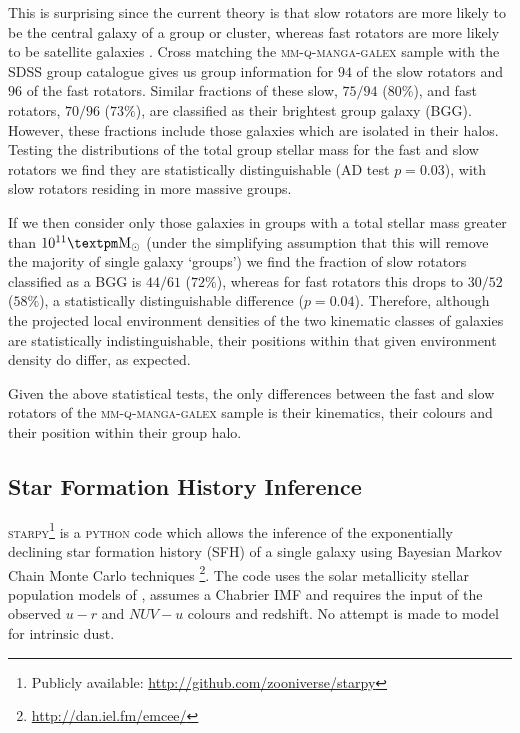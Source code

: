 \documentclass[useAMS,usenatbib]{mn2e}
\begin{document}
This is surprising since the current theory is that slow rotators are more likely to be the central galaxy of a group or cluster, whereas fast rotators are more likely to be satellite galaxies \citep{cappellari11, deugenio13, houghton13, scott14}. Cross matching the \textsc{mm-q-manga-galex} sample with the \cite{yang09} SDSS group catalogue gives us group information for $94$ of the slow rotators and $96$ of the fast rotators. Similar fractions of these slow, $75/94$ ($80\%$), and fast rotators, $70/96$ ($73\%$), are classified as their brightest group galaxy (BGG). However, these fractions include those galaxies which are isolated in their halos. Testing the distributions of the total group stellar mass for the fast and slow rotators we find they are statistically distinguishable (AD test $p=0.03$), with slow rotators residing in more massive groups. 

If we then consider only those galaxies in groups with a total stellar mass greater than $10^{11}±\rm{M}_{\odot}$ (under the simplifying assumption that this will remove the majority of single galaxy `groups') we find the fraction of slow rotators classified as a BGG is $44/61$ ($72\%$), whereas for fast rotators this drops to $30/52$ ($58\%$), a statistically distinguishable difference ($p=0.04$). Therefore, although the projected local environment densities of the two kinematic classes of galaxies are statistically indistinguishable, their positions within that given environment density do differ, as expected. 

Given the above statistical tests, the only differences between the fast and slow rotators of the \textsc{mm-q-manga-galex} sample is their kinematics, their colours and their position within their group halo.


\subsection{Star Formation History Inference}\label{sec:starpy}

\textsc{starpy}\footnote{Publicly available: \url{http://github.com/zooniverse/starpy}} is a \textsc{python} code which allows the inference of the exponentially declining star formation history (SFH) of a single galaxy using  Bayesian Markov Chain Monte Carlo techniques \citep{emcee13}\footnote{\url{http://dan.iel.fm/emcee/}}. The code uses the solar metallicity stellar population models of \cite[][hereafter BC03]{BC03}, assumes a Chabrier IMF \citep{chabrier03} and requires the input of the observed $u-r$ and $NUV-u$ colours and redshift. No attempt is made to model for intrinsic dust. 
\end{document}
